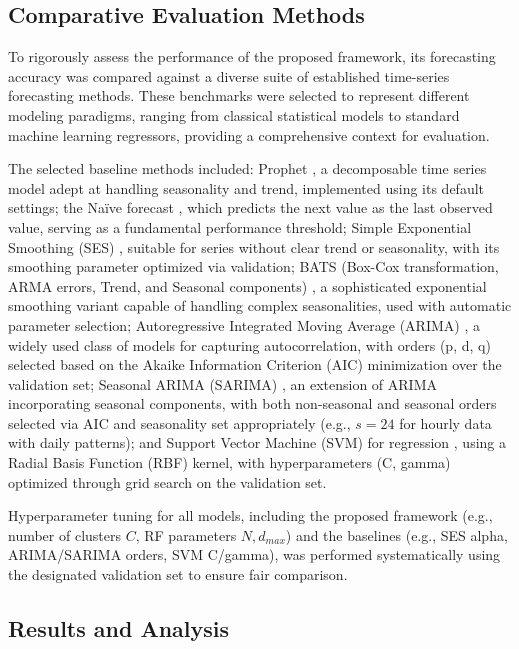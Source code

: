 \documentclass[review,3p,times]{elsarticle}
\begin{document}
\subsection{Comparative Evaluation Methods}
\label{subsec:comparative_evaluation}

To rigorously assess the performance of the proposed framework, its forecasting accuracy was compared against a diverse suite of established time-series forecasting methods. These benchmarks were selected to represent different modeling paradigms, ranging from classical statistical models to standard machine learning regressors, providing a comprehensive context for evaluation.

The selected baseline methods included: Prophet \cite{taylor2018forecasting}, a decomposable time series model adept at handling seasonality and trend, implemented using its default settings; the Naïve forecast \cite{ahuja2023expectation}, which predicts the next value as the last observed value, serving as a fundamental performance threshold; Simple Exponential Smoothing (SES) \cite{fried2011exponential}, suitable for series without clear trend or seasonality, with its smoothing parameter optimized via validation; BATS (Box-Cox transformation, ARMA errors, Trend, and Seasonal components) \cite{de2011forecasting}, a sophisticated exponential smoothing variant capable of handling complex seasonalities, used with automatic parameter selection; Autoregressive Integrated Moving Average (ARIMA) \cite{anderson2011statistical}, a widely used class of models for capturing autocorrelation, with orders (p, d, q) selected based on the Akaike Information Criterion (AIC) minimization over the validation set; Seasonal ARIMA (SARIMA) \cite{valipour2015long}, an extension of ARIMA incorporating seasonal components, with both non-seasonal and seasonal orders selected via AIC and seasonality set appropriately (e.g., $s=24$ for hourly data with daily patterns); and Support Vector Machine (SVM) for regression \cite{suthaharan2016support}, using a Radial Basis Function (RBF) kernel, with hyperparameters (C, gamma) optimized through grid search on the validation set.

Hyperparameter tuning for all models, including the proposed framework (e.g., number of clusters $C$, RF parameters $N, d_{max}$) and the baselines (e.g., SES alpha, ARIMA/SARIMA orders, SVM C/gamma), was performed systematically using the designated validation set to ensure fair comparison.

\subsection{Results and Analysis}
\label{subsec:results_analysis}
\end{document}
